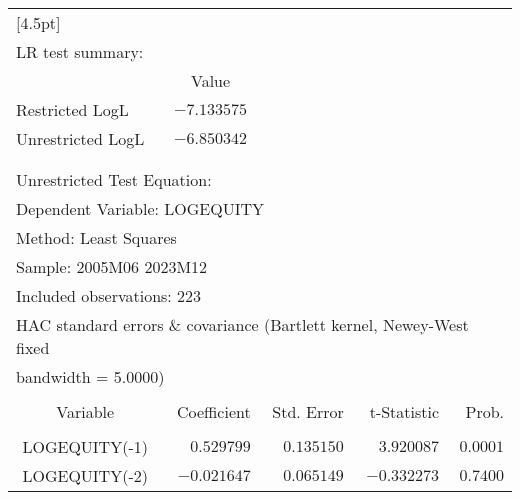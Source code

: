 \begin{tabular}{lrrrr}
[4.5pt] \hline \\ [-4.5pt]
\multicolumn{1}{l}{LR test summary:}&\multicolumn{1}{c}{}&\multicolumn{1}{c}{}&\multicolumn{1}{c}{}&\multicolumn{1}{c}{}\\
\multicolumn{1}{c}{}&\multicolumn{1}{c}{Value}&\multicolumn{1}{c}{}&\multicolumn{1}{c}{}&\multicolumn{1}{c}{}\\
\multicolumn{1}{l}{Restricted LogL}&\multicolumn{1}{c}{$-7.133575$}&\multicolumn{1}{c}{}&\multicolumn{1}{c}{}&\multicolumn{1}{c}{}\\
\multicolumn{1}{l}{Unrestricted LogL}&\multicolumn{1}{c}{$-6.850342$}&\multicolumn{1}{c}{}&\multicolumn{1}{c}{}&\multicolumn{1}{c}{}\\
[4.5pt] \hline \\ [-4.5pt]
\multicolumn{1}{c}{}&\multicolumn{1}{c}{}&\multicolumn{1}{c}{}&\multicolumn{1}{c}{}&\multicolumn{1}{c}{}\\
\multicolumn{2}{l}{Unrestricted Test Equation:}&\multicolumn{1}{c}{}&\multicolumn{1}{c}{}&\multicolumn{1}{c}{}\\
\multicolumn{3}{l}{Dependent Variable: LOGEQUITY}&\multicolumn{1}{c}{}&\multicolumn{1}{c}{}\\
\multicolumn{2}{l}{Method: Least Squares}&\multicolumn{1}{c}{}&\multicolumn{1}{c}{}&\multicolumn{1}{c}{}\\
\multicolumn{2}{l}{Sample: 2005M06 2023M12}&\multicolumn{1}{c}{}&\multicolumn{1}{c}{}&\multicolumn{1}{c}{}\\
\multicolumn{2}{l}{Included observations: 223}&\multicolumn{1}{c}{}&\multicolumn{1}{c}{}&\multicolumn{1}{c}{}\\
\multicolumn{6}{l}{HAC standard errors \& covariance (Bartlett kernel, Newey-West fixed}\\
\multicolumn{2}{l}{bandwidth = 5.0000)}&\multicolumn{1}{c}{}&\multicolumn{1}{c}{}&\multicolumn{1}{c}{}\\
[4.5pt] \hline \\ [-4.5pt]
\multicolumn{1}{c}{Variable}&\multicolumn{1}{r}{Coefficient}&\multicolumn{1}{r}{Std. Error}&\multicolumn{1}{r}{t-Statistic}&\multicolumn{1}{r}{Prob.}\\
[4.5pt] \hline \\ [-4.5pt]
\multicolumn{1}{c}{LOGEQUITY(-1)}&\multicolumn{1}{r}{$0.529799$}&\multicolumn{1}{r}{$0.135150$}&\multicolumn{1}{r}{$3.920087$}&\multicolumn{1}{r}{$0.0001$}\\
\multicolumn{1}{c}{LOGEQUITY(-2)}&\multicolumn{1}{r}{$-0.021647$}&\multicolumn{1}{r}{$0.065149$}&\multicolumn{1}{r}{$-0.332273$}&\multicolumn{1}{r}{$0.7400$}\\

\end{tabular}
